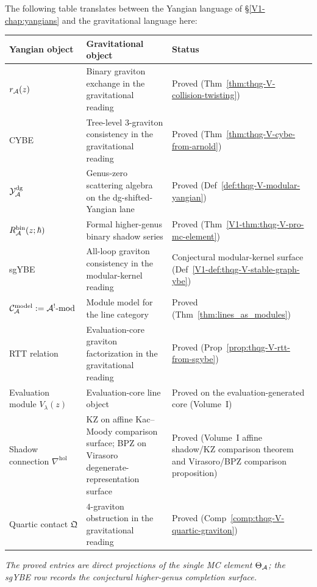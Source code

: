 \begin{remark}
The following table translates between the Yangian language of
\S\ref{V1-chap:yangians} and the gravitational language here:

\begin{center}
\renewcommand{\arraystretch}{1.3}
\small
\begin{tabular}{@{}lll@{}}
\toprule
\textbf{Yangian object} & \textbf{Gravitational object}
 & \textbf{Status} \\
\midrule
$r_{\mathcal{A}}(z)$ & Binary graviton exchange in the gravitational reading
 & Proved (Thm~\ref{thm:thqg-V-collision-twisting}) \\
CYBE & Tree-level $3$-graviton consistency in the gravitational reading
 & Proved (Thm~\ref{thm:thqg-V-cybe-from-arnold}) \\
$\mathcal{Y}^{\mathrm{dg}}_{\mathcal{A}}$ & Genus-zero scattering algebra on the dg-shifted-Yangian lane
 & Proved (Def~\ref{def:thqg-V-modular-yangian}) \\
$R^{\mathrm{bin}}_{\mathcal{A}}(z;\hbar)$ & Formal higher-genus binary shadow series
 & Proved (Thm~\ref*{V1-thm:thqg-V-pro-mc-element}) \\
sgYBE & All-loop graviton consistency in the modular-kernel reading
 & Conjectural modular-kernel surface
 (Def~\ref*{V1-def:thqg-V-stable-graph-ybe}) \\
$\mathcal{C}_{\mathcal{A}}^{\mathrm{model}} := \mathcal{A}^!\text{-mod}$ & Module model for the line category
 & Proved (Thm~\ref{thm:lines_as_modules}) \\
RTT relation & Evaluation-core graviton factorization in the gravitational reading
 & Proved (Prop~\ref{prop:thqg-V-rtt-from-sgybe}) \\
Evaluation module $V_\lambda(z)$ & Evaluation-core line object
 & Proved on the evaluation-generated core
 (Volume~I) \\
Shadow connection $\nabla^{\mathrm{hol}}$
 & KZ on affine Kac--Moody comparison surface; BPZ on Virasoro
 degenerate-representation surface
 & Proved (Volume~I affine shadow/KZ comparison theorem and
 Virasoro/BPZ comparison proposition) \\
Quartic contact $\mathfrak{Q}$ & $4$-graviton obstruction in the gravitational reading
 & Proved (Comp~\ref{comp:thqg-V-quartic-graviton}) \\
\bottomrule
\end{tabular}
\end{center}
\emph{The proved entries are direct projections of the single MC
element $\Theta_{\mathcal{A}}$; the sgYBE row records the conjectural
higher-genus completion surface.}
\end{remark}


